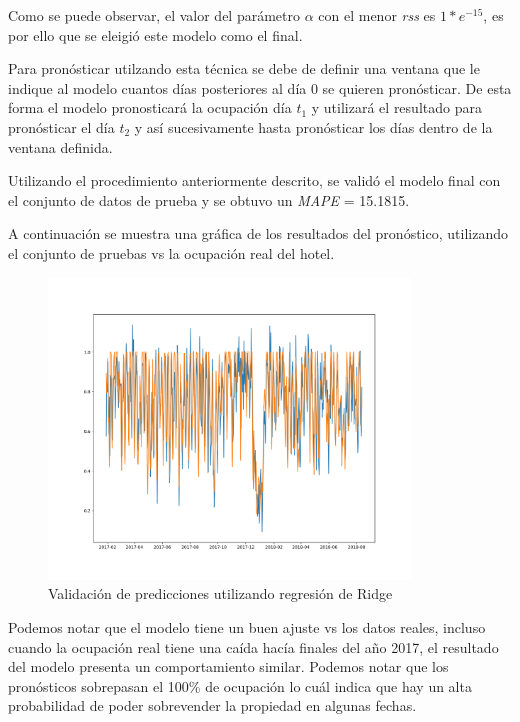 Como se puede observar, el valor del parámetro $\alpha$ con el menor \emph{rss} es $1*e^{-15}$, es por ello que se eleigió este modelo como el final. 

Para pronósticar utilzando esta técnica se debe de definir una ventana que le indique al modelo cuantos días posteriores al día 0 se quieren pronósticar. De esta forma el modelo pronosticará la ocupación día $t_1$ y utilizará el resultado para pronósticar el día $t_2$ y así sucesivamente hasta pronósticar los días dentro de la ventana definida.

Utilizando el procedimiento anteriormente descrito, se validó el modelo final con el conjunto de datos de prueba y se obtuvo un \emph{MAPE} = 15.1815.

A continuación se muestra una gráfica de los resultados del pronóstico, utilizando el conjunto de pruebas vs la ocupación real del hotel.

\begin{figure}[H]
  \centering
      \includegraphics[width=\maxwidth,height=8cm]{figures/RidgeTest.png}    
  \caption{Validación de predicciones utilizando regresión de Ridge}
\end{figure}

Podemos notar que el modelo tiene un buen ajuste vs los datos reales, incluso cuando la ocupación real tiene una caída hacía finales del año 2017, el resultado del modelo presenta un comportamiento similar. Podemos notar que los pronósticos sobrepasan el 100\% de ocupación lo cuál indica que hay un alta probabilidad de poder sobrevender la propiedad en algunas fechas.

